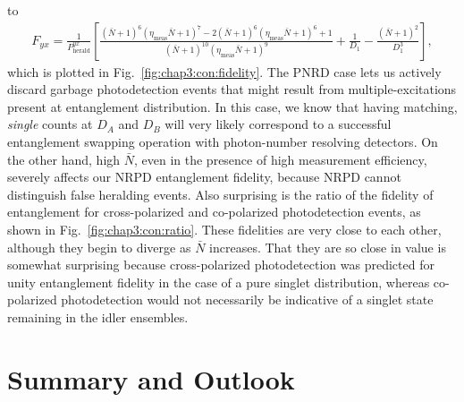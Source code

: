 \documentclass[aps,twocolumn,secnumarabic,amsmath,amssymb,pra,groupedaddress,
showpacs, showkeys]{revtex4-1}
\newcommand{\pna}[1]{\left(#1\right)}
\newcommand{\pnb}[1]{\left[#1\right]}
\begin{document}
to
\begin{align}
    F_{yx}=\frac{1}{P_{\textrm{herald}}^{yx}}\pnb{\frac{(\bar{N}+1)^6 (\eta_{\textrm{meas}}  \bar{N}+1)^7-2 (\bar{N}+1)^6 (\eta_{\textrm{meas}}  \bar{N}+1)^6+1}{(\bar{N}+1)^{10} (\eta_{\textrm{meas}}  \bar{N}+1)^9} +\frac{1}{D_1}-\frac{\pna{\bar{N}+1}^2}{D_1^3}},
\end{align}
which is plotted in Fig.~\ref{fig:chap3:con:fidelity}. The PNRD case lets us
actively discard garbage photodetection events that might result from
multiple-excitations present at entanglement distribution. In this case, we
know that having matching, \emph{single} counts at $D_A$ and $D_B$ will very
likely correspond to a successful entanglement swapping operation with
photon-number resolving detectors. On the other hand, high $\bar{N}$, even in
the presence of high measurement efficiency, severely affects our NRPD
entanglement fidelity, because NRPD cannot distinguish false heralding
events. Also surprising is the ratio of the fidelity of entanglement for
cross-polarized and co-polarized photodetection events, as shown in
Fig.~\ref{fig:chap3:con:ratio}. These fidelities are very close to each other,
although they begin to diverge as $\bar{N}$ increases. That they are so close
in value is somewhat surprising because cross-polarized photodetection was
predicted for unity entanglement fidelity in the case of a pure singlet
distribution, whereas co-polarized photodetection would not necessarily be
indicative of a singlet state remaining in the idler ensembles.


\section{Summary and Outlook~\label{chap:conclusion}}

\end{document}
